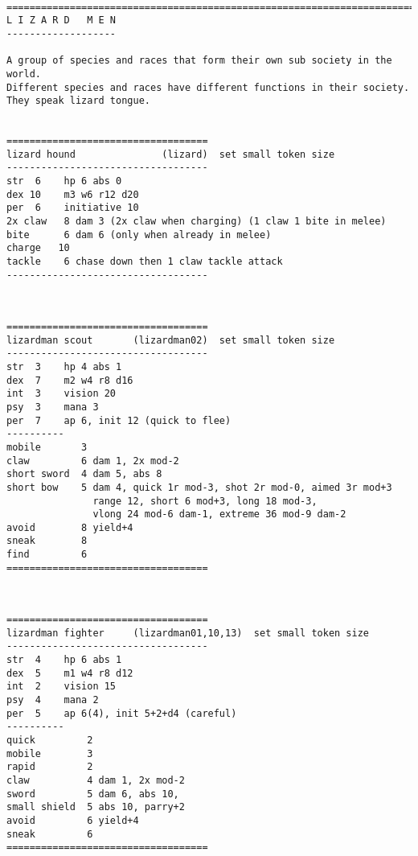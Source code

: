 \







\clearpage
{} {}

\goodbreak \begin{samepage} \small \begin{verbatim}
================================================================================
L I Z A R D   M E N
-------------------

A group of species and races that form their own sub society in the world.
Different species and races have different functions in their society.
They speak lizard tongue.


===================================
lizard hound               (lizard)  set small token size
-----------------------------------
str  6    hp 6 abs 0
dex 10    m3 w6 r12 d20
per  6    initiative 10
2x claw   8 dam 3 (2x claw when charging) (1 claw 1 bite in melee)
bite      6 dam 6 (only when already in melee)
charge   10
tackle    6 chase down then 1 claw tackle attack
-----------------------------------
\end{verbatim} \normalsize \end{samepage}

\

\goodbreak \begin{samepage} \small \begin{verbatim}
===================================
lizardman scout       (lizardman02)  set small token size
-----------------------------------
str  3    hp 4 abs 1
dex  7    m2 w4 r8 d16
int  3    vision 20
psy  3    mana 3
per  7    ap 6, init 12 (quick to flee)
----------
mobile       3
claw         6 dam 1, 2x mod-2
short sword  4 dam 5, abs 8
short bow    5 dam 4, quick 1r mod-3, shot 2r mod-0, aimed 3r mod+3
               range 12, short 6 mod+3, long 18 mod-3,
               vlong 24 mod-6 dam-1, extreme 36 mod-9 dam-2
avoid        8 yield+4
sneak        8
find         6
===================================
\end{verbatim} \normalsize \end{samepage}

\

\goodbreak \begin{samepage} \small \begin{verbatim}
===================================
lizardman fighter     (lizardman01,10,13)  set small token size
-----------------------------------
str  4    hp 6 abs 1
dex  5    m1 w4 r8 d12
int  2    vision 15
psy  4    mana 2
per  5    ap 6(4), init 5+2+d4 (careful)
----------
quick         2
mobile        3
rapid         2
claw          4 dam 1, 2x mod-2
sword         5 dam 6, abs 10,
small shield  5 abs 10, parry+2
avoid         6 yield+4
sneak         6
===================================
\end{verbatim} \normalsize \end{samepage}

